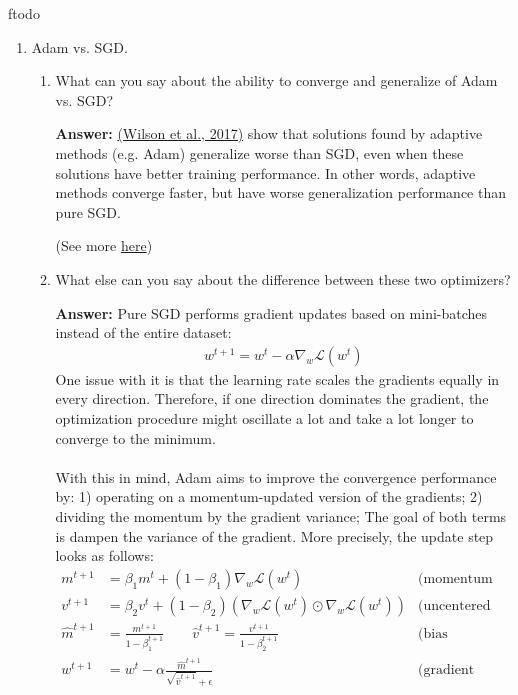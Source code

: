 ƒtodo\documentclass{article}
\newenvironment{QandA}{\begin{enumerate}[label=\arabic*.]}{\end{enumerate}}
\newenvironment{InnerQandA}{\begin{enumerate}[label=\roman*.]}{\end{enumerate}}
\newenvironment{answer}{\par\normalfont \textbf{Answer:}}{}
\begin{document}
\begin{QandA}
\begin{answer}
        (See more \href{https://towardsdatascience.com/learning-parameters-part-5-65a2f3583f7d}{here})
    \end{answer}

    \item Adam vs. SGD.
    \begin{InnerQandA}
        \item What can you say about the ability to converge and generalize of Adam vs. SGD?
        \begin{answer}
            \href{https://arxiv.org/abs/1705.08292}{(Wilson et al., 2017)} show that solutions found by adaptive methods (e.g. Adam) generalize worse than SGD, even when these solutions have better training performance. In other words, adaptive methods converge faster, but have worse generalization performance than pure SGD. 

            (See more \href{https://shaoanlu.wordpress.com/2017/05/29/sgd-all-which-one-is-the-best-optimizer-dogs-vs-cats-toy-experiment/}{here})
        \end{answer}

        \item What else can you say about the difference between these two optimizers?
        \begin{answer}
            Pure SGD performs gradient updates based on mini-batches instead of the entire dataset:
            \begin{align*}
                w^{t+1} = w^t - \alpha \nabla_w \mathcal{L}(w^t)
            \end{align*}
            One issue with it is that the learning rate scales the gradients equally in every direction. Therefore, if one direction dominates the gradient, the optimization procedure might oscillate a lot and take a lot longer to converge to the minimum. \\\\
            With this in mind, Adam aims to improve the convergence performance by: 1) operating on a momentum-updated version of the gradients; 2) dividing the momentum by the gradient variance; The goal of both terms is dampen the variance of the gradient. More precisely, the update step looks as follows:
            \begin{align*}
                m^{t+1} &= \beta_1 m^t + (1-\beta_1)\nabla_w \mathcal{L}(w^t) &\text{(momentum gradient)} \\
                v^{t+1} &= \beta_2 v^{t} + (1-\beta_2)(\nabla_w \mathcal{L}(w^t) \odot \nabla_w \mathcal{L}(w^t)) &\text{(uncentered variance)}  \\
                \hat{m}^{t+1} &= \frac{m^{t+1}}{1 - \beta_1^{t+1}} \quad\quad \hat{v}^{t+1} = \frac{v^{t+1}}{1 - \beta_2^{t+1}} &\text{(bias correction)} \\
                w^{t+1} &= w^t - \alpha \frac{\hat{m}^{t+1}}{\sqrt{\hat{v}^{t+1}} + \epsilon} & \text{(gradient step)}
            \end{align*}
        \end{answer}
    \end{InnerQandA}


\end{QandA}
\end{document}
